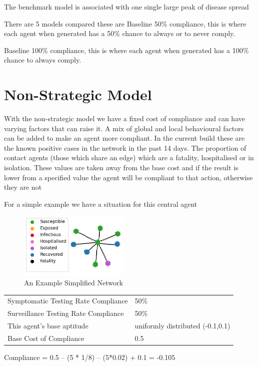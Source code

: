 \documentclass{article}
\begin{document}
The benchmark model is associated with one single large peak of disease spread

There are 5 models compared these are
Baseline 50\% compliance, this is where each agent when generated has a 50\% chance to always or to never comply. 

Baseline 100\% compliance, this is where each agent when generated has a 100\% chance to always comply. 

\newpage

\section{Non-Strategic Model}
With the non-strategic model we have a fixed cost of compliance and can have varying factors that can raise it. A mix of global and local behavioural factors can be added to make an agent more compliant. In the current build these are the known positive cases in the network in the past 14 days. The proportion of contact agents (those which share an edge) which are a fatality, hospitalised or in isolation. These values are taken away from the base cost and if the result is lower from a specified value the agent will be compliant to that action, otherwise they are not

For a simple example we have a situation for this central agent 

\begin{figure}[h!]
  \centering
      \includegraphics[width =150pt]{basicnet}
  \caption{An Example Simplified Network}
\end{figure}


\begin{table}[h!]
\begin{tabular}{ll}
Symptomatic Testing Rate Compliance & 50\% \\
Surveillance Testing Rate Compliance & 50\% \\
This agent’s base aptitude & uniformly distributed (-0.1,0.1) \\
Base Cost of Compliance & 0.5 
\end{tabular}
\end{table}

Compliance = 0.5 – (5 * 1/8) – (5*0.02) + 0.1 = -0.105
\end{document}
